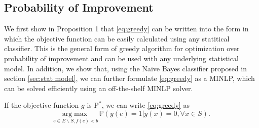 \documentclass[opre,nonblindrev]{informs3} %
\newcommand{\PI}{\text{P}^*}
\begin{document}
\subsection{Probability of Improvement}
We first show in Proposition 1 that \eqref{eq:greedy} can be written into the form in which the objective function can be easily calculated using any statitical classifier. This is the general form of greedy algorithm for optimization over probability of improvement and can be used with any underlying statistical model. In addition, we show that, using the Naive Bayes classifier proposed in section \ref{sec:stat model}, we can further formulate \eqref{eq:greedy} as a MINLP, which can be solved efficiently using an off-the-shelf MINLP solver.
\begin{proposition}
  If the objective function $g$ is $\PI$, we can write \eqref{eq:greedy} as 
  \begin{equation} \label{eq:PI3}
    \underset{e \in E \backslash S, f(e)<b}{\mathrm{arg}\max} \, \mathbb{P}(y(e)=1|y(x)=0, \forall x \in S).
  \end{equation}
\end{proposition}
\end{document}
